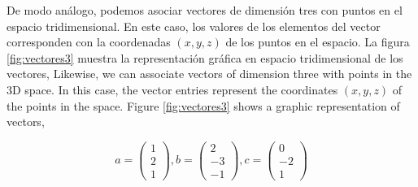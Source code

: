 \begin{paracol}{2}
De modo análogo, podemos asociar vectores de dimensión tres con puntos en el espacio tridimensional. En este caso, los valores de los elementos del vector corresponden con la coordenadas $(x,y,z)$ de los puntos en el espacio. La figura \ref{fig:vectores3} muestra la representación gráfica en espacio tridimensional de los vectores,
\switchcolumn
Likewise, we can associate vectors of dimension three with points in the 3D space. In this case, the vector entries represent the coordinates $(x,y,z)$ of the points in the space. Figure \ref{fig:vectores3} shows a graphic representation of vectors,
\end{paracol}
\begin{equation*}
a=
\begin{pmatrix}
1\\
2\\
1
\end{pmatrix},
b=
\begin{pmatrix}
2\\
-3\\
-1
\end{pmatrix},
c=
\begin{pmatrix}
0\\
-2\\
1
\end{pmatrix}
\end{equation*}

